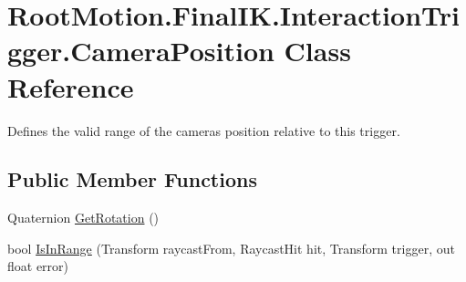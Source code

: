 \hypertarget{class_root_motion_1_1_final_i_k_1_1_interaction_trigger_1_1_camera_position}{}\section{Root\+Motion.\+Final\+I\+K.\+Interaction\+Trigger.\+Camera\+Position Class Reference}
\label{class_root_motion_1_1_final_i_k_1_1_interaction_trigger_1_1_camera_position}


Defines the valid range of the camera\textquotesingle{}s position relative to this trigger.  


\subsection*{Public Member Functions}
\begin{DoxyCompactItemize}
\item 
Quaternion \mbox{\hyperlink{class_root_motion_1_1_final_i_k_1_1_interaction_trigger_1_1_camera_position_a3cc1a3c7dda2bc6dde90a9481bed0a82}{Get\+Rotation}} ()
\item 
bool \mbox{\hyperlink{class_root_motion_1_1_final_i_k_1_1_interaction_trigger_1_1_camera_position_a8fc0858e44b69e3c120c8695ac319e75}{Is\+In\+Range}} (Transform raycast\+From, Raycast\+Hit hit, Transform trigger, out float error)
\end{DoxyCompactItemize}
